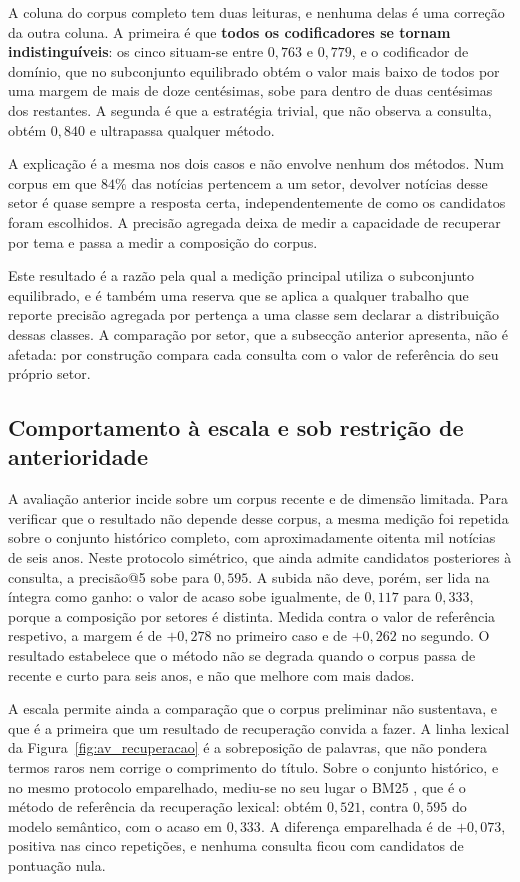 A coluna do corpus completo tem duas leituras, e nenhuma delas é uma correção da outra coluna. A
primeira é que \textbf{todos os codificadores se tornam indistinguíveis}: os cinco situam-se entre
$0{,}763$ e $0{,}779$, e o codificador de domínio, que no subconjunto equilibrado obtém o valor
mais baixo de todos por uma margem de mais de doze centésimas, sobe para dentro de duas
centésimas dos restantes. A segunda é que a estratégia trivial, que não observa a consulta, obtém
$0{,}840$ e ultrapassa qualquer método.

A explicação é a mesma nos dois casos e não envolve nenhum dos métodos. Num corpus em que $84\%$
das notícias pertencem a um setor, devolver notícias desse setor é quase sempre a resposta certa,
independentemente de como os candidatos foram escolhidos. A precisão agregada deixa de medir a
capacidade de recuperar por tema e passa a medir a composição do corpus.

Este resultado é a razão pela qual a medição principal utiliza o subconjunto equilibrado, e é
também uma reserva que se aplica a qualquer trabalho que reporte precisão agregada por pertença a
uma classe sem declarar a distribuição dessas classes. A comparação por setor, que a subsecção
anterior apresenta, não é afetada: por construção compara cada consulta com o valor de referência
do seu próprio setor.

\subsection{Comportamento à escala e sob restrição de anterioridade}

A avaliação anterior incide sobre um corpus recente e de dimensão limitada. Para verificar que o
resultado não depende desse corpus, a mesma medição foi repetida sobre o conjunto histórico
completo, com aproximadamente oitenta mil notícias de seis anos. Neste protocolo simétrico, que
ainda admite candidatos posteriores à consulta, a precisão@5 sobe para $0{,}595$. A subida não deve,
porém, ser lida na íntegra como ganho: o valor de acaso sobe igualmente, de $0{,}117$ para $0{,}333$,
porque a composição por setores é distinta. Medida contra o valor de referência respetivo, a margem
é de $+0{,}278$ no primeiro caso e de $+0{,}262$ no segundo. O resultado estabelece que o método não
se degrada quando o corpus passa de recente e curto para seis anos, e não que melhore com mais dados.

A escala permite ainda a comparação que o corpus preliminar não sustentava, e que é a primeira que
um resultado de recuperação convida a fazer. A linha lexical da Figura~\ref{fig:av_recuperacao} é a
sobreposição de palavras, que não pondera termos raros nem corrige o comprimento do título. Sobre o
conjunto histórico, e no mesmo protocolo emparelhado, mediu-se no seu lugar o BM25
\autocite{robertson2009bm25}, que é o método de referência da recuperação lexical: obtém $0{,}521$,
contra $0{,}595$ do modelo semântico, com o acaso em $0{,}333$. A diferença emparelhada é de
$+0{,}073$, positiva nas cinco repetições, e nenhuma consulta ficou com candidatos de pontuação nula.

